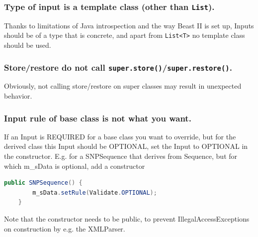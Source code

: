 \documentclass{article}
\begin{document}
\subsubsection{Type of input is a template class (other than {\tt List}).}

Thanks to limitations of Java introspection and the way Beast II is set up, Inputs should be 
of a type that is concrete, and apart from {\tt List<T>} no template class should be used.

\subsubsection{Store/restore do not call {\tt super.store()}/{\tt super.restore()}.}

Obviously, not calling store/restore on super classes may result in unexpected behavior.

\subsubsection{Input rule of base class is not what you want.}

If an Input is REQUIRED for a base class you want to override, but for the derived
class this Input should be OPTIONAL, set the Input to OPTIONAL in the constructor.
E.g. for a SNPSequence that derives from Sequence, but for which m\_sData is optional,
add a constructor

{\color{blue}\begin{lstlisting}[language=java]
	public SNPSequence() {
		m_sData.setRule(Validate.OPTIONAL);
	}
\end{lstlisting}}
Note that the constructor needs to be public, to prevent IllegalAccessExceptions
on construction by e.g. the XMLParser.
\end{document}

